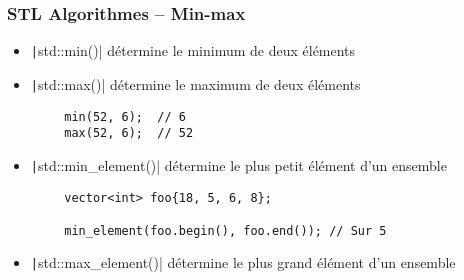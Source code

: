 \documentclass[C++.tex]{subfiles}
\begin{document}
\begin{frame}[fragile]
	\frametitle{STL Algorithmes -- Min-max}

	\begin{itemize}
		\item \texttt|std::min()| détermine le minimum de deux éléments
		\item \texttt|std::max()| détermine le maximum de deux éléments
	\end{itemize}

	\begin{verbatim}
		min(52, 6);  // 6
		max(52, 6);  // 52
	\end{verbatim}

	\begin{itemize}
		\item \texttt|std::min_element()| détermine le plus petit élément d'un ensemble
	\end{itemize}

	\begin{verbatim}
		vector<int> foo{18, 5, 6, 8};

		min_element(foo.begin(), foo.end()); // Sur 5
	\end{verbatim}

	\begin{itemize}
		\item \texttt|std::max_element()| détermine le plus grand élément d'un ensemble
	\end{itemize}

\end{frame}
\end{document}
